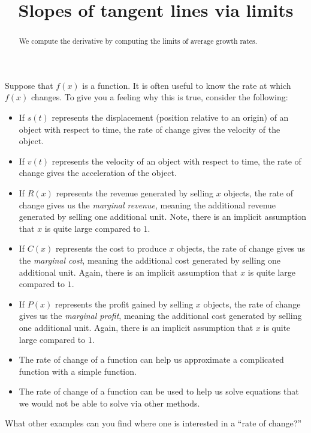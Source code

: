 \documentclass{ximera}
\title[Dig-In:]{Slopes of tangent lines via limits} %
\begin{document}
\begin{abstract}
We compute the derivative by computing the limits of average growth %
rates.
\end{abstract}
\maketitle


Suppose that $f(x)$ is a function.  It is often useful to know the
rate at which $f(x)$ changes. To give you a feeling why this is true,
consider the following:
\begin{itemize}
\item If $s(t)$ represents the displacement (position relative to an
  origin) of an object with respect to time, the rate of change gives
  the velocity of the object.
\item If $v(t)$ represents the velocity of an object with respect to
  time, the rate of change gives the acceleration of the object.
\item If $R(x)$ represents the revenue generated by selling $x$
  objects, the rate of change gives us the \textit{marginal revenue},
  meaning the additional revenue generated by selling one additional
  unit. Note, there is an implicit assumption that $x$ is quite large
  compared to $1$.
\item If $C(x)$ represents the cost to produce $x$ objects, the rate
  of change gives us the \textit{marginal cost}, meaning the
  additional cost generated by selling one additional unit. Again,
  there is an implicit assumption that $x$ is quite large compared to
  $1$.
\item If $P(x)$ represents the profit gained by selling $x$ objects,
  the rate of change gives us the \textit{marginal profit}, meaning
  the additional cost generated by selling one additional unit. Again,
  there is an implicit assumption that $x$ is quite large compared to
  $1$.
\item The rate of change of a function can help us approximate a
  complicated function with a simple function.
\item The rate of change of a function can be used to help us solve
  equations that we would not be able to solve via other methods.
\end{itemize}

\begin{xarmaBoost}
What other examples can you find where one is interested in a ``rate
of change?''
\begin{freeResponse}
\end{freeResponse}
\end{xarmaBoost}
\end{document}
